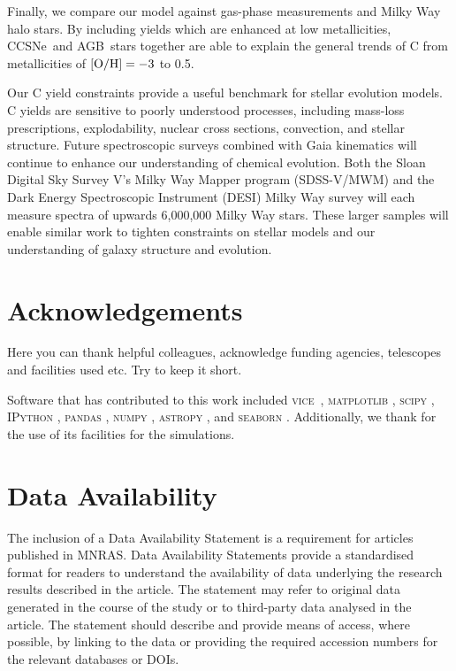\documentclass[fleqn,
usenatbib]{mnras}
\newcommand{\VICE}{\textsc{vice}}
\newcommand{\agb}{AGB}
\newcommand{\cc}{CCSNe}
\begin{document}
Finally, we compare our model against gas-phase measurements and Milky Way halo stars. By including yields which are enhanced at low metallicities, \cc\ and \agb\ stars together are able to explain the general trends of C from metallicities of ${\rm [O/H]} = -3$ to 0.5. 

Our C yield constraints provide a useful benchmark for stellar evolution models. C yields are sensitive to poorly understood processes, including mass-loss prescriptions, explodability, nuclear cross sections, convection, and stellar structure. Future spectroscopic surveys combined with Gaia kinematics \citep{gaia} will continue to enhance our understanding of chemical evolution. Both the Sloan Digital Sky Survey V's Milky Way Mapper program ({\sc SDSS-V/MWM}) \citep{sdssv} and the Dark Energy Spectroscopic Instrument ({\sc DESI}) Milky Way survey \citep{desi, desi:mw} will each measure spectra of upwards 6,000,000 Milky Way stars. These larger samples will enable similar work to tighten constraints on stellar models and our understanding of galaxy structure and evolution.




\section*{Acknowledgements}

 Here you can thank helpful
colleagues, acknowledge funding agencies, telescopes and facilities used etc.
Try to keep it short.

Software that has contributed to this work included  
\VICE~\citep{JW20, james+21},
\textsc{matplotlib} \citep{matplotlib},
\textsc{scipy} \citep{scipy},
\textsc{IPython} \citep{ipy},
\textsc{pandas} \citep{pandas},
\textsc{numpy} \citep{numpy},
\textsc{astropy} \citep{astropy:2013, astropy:2018, astropy:2022},
and 
\textsc{seaborn} \citep{seaborn}
.
Additionally, we thank \citet{OhioSupercomputerCenter1987} for the use of its facilities for the simulations. 


\section*{Data Availability}

 
The inclusion of a Data Availability Statement is a requirement for articles published in MNRAS. Data Availability Statements provide a standardised format for readers to understand the availability of data underlying the research results described in the article. The statement may refer to original data generated in the course of the study or to third-party data analysed in the article. The statement should describe and provide means of access, where possible, by linking to the data or providing the required accession numbers for the relevant databases or DOIs.







\appendix


\bsp	%
\label{lastpage}
\end{document}
